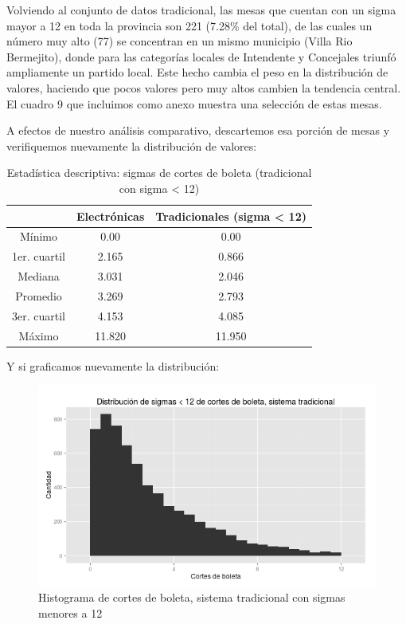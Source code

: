 \documentclass[12pt,a4paper]{article}
\begin{document}
Volviendo al conjunto de datos tradicional, las mesas que cuentan con
un sigma mayor a 12 en toda la provincia son 221 (7.28\% del total), de las
cuales un número muy alto (77) se concentran en un mismo municipio (Villa Rio
Bermejito), donde para las categorías locales de Intendente y Concejales triunfó
ampliamente un partido local. Este hecho cambia el peso en la distribución de
valores, haciendo que pocos valores pero muy altos cambien la tendencia central.
El cuadro 9 que incluimos como anexo muestra una selección de estas mesas.

A efectos de nuestro análisis comparativo, descartemos esa porción de mesas y
verifiquemos nuevamente la distribución de valores:

\begin{table}[h]
\centering
\label{my-label}
\begin{tabular}{c c c}
 & Electrónicas & Tradicionales (sigma < 12) \\
\hline
Mínimo & 0.00 & 0.00 \\
1er. cuartil & 2.165 & 0.866 \\
Mediana & 3.031 & 2.046 \\
Promedio & 3.269 & 2.793 \\
3er. cuartil & 4.153 & 4.085 \\
Máximo & 11.820 & 11.950 \\
\hline
\end{tabular}
\caption{Estadística descriptiva: sigmas de cortes de boleta (tradicional con
  sigma < 12)}
\label{table:1}
\end{table}

\pagebreak

Y si graficamos nuevamente la distribución:

\begin{figure}[h]
\centering
    \includegraphics[width=\textwidth]{sigmas_tradicional_menor_a_12}
\caption{Histograma de cortes de boleta, sistema tradicional con sigmas menores
  a 12}
\end{figure}
\end{document}
